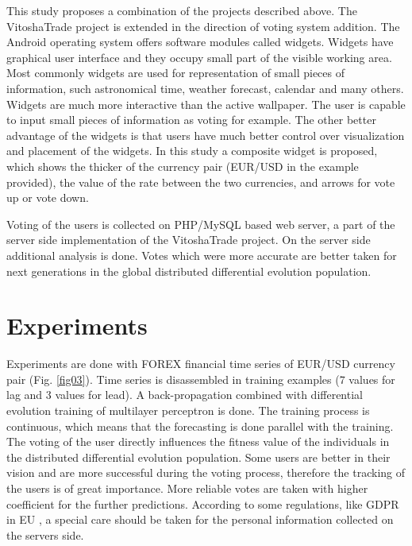 \documentclass[runningheads]{llncs}
\begin{document}
This study proposes a combination of the projects described above. The VitoshaTrade project is extended in the direction of voting system addition. The Android operating system offers software modules called widgets. Widgets have graphical user interface and they occupy small part of the visible working area. Most commonly widgets are used for representation of small pieces of information, such astronomical time, weather forecast, calendar and many others. Widgets are much more interactive than the active wallpaper. The user is capable to input small pieces of information as voting for example. The other better advantage of the widgets is that users have much better control over visualization and placement of the widgets. In this study a composite widget is proposed, which shows the thicker of the currency pair (EUR/USD in the example provided), the value of the rate between the two currencies, and arrows for vote up or vote down. 

Voting of the users is collected on PHP/MySQL based web server\cite{tomov01}, a part of the server side implementation of the VitoshaTrade project. On the server side additional analysis is done. Votes which were more accurate are better taken for next generations in the global distributed differential evolution population. 

\section{Experiments} \label{Experiments}

Experiments are done with FOREX financial time series of EUR/USD currency pair (Fig. \ref{fig03}). Time series is disassembled in training examples (7 values for lag and 3 values for lead). A back-propagation combined with differential evolution training of multilayer perceptron is done. The training process is continuous, which means that the forecasting is done parallel with the training. The voting of the user directly influences the fitness value of the individuals in the distributed differential evolution population. Some users are better in their vision and are more successful during the voting process, therefore the tracking of the users is of great importance. More reliable votes are taken with higher coefficient for the further predictions. According to some regulations, like GDPR in EU \cite{hristov01}, a special care should be taken for the personal information collected on the servers side. 
\end{document}
